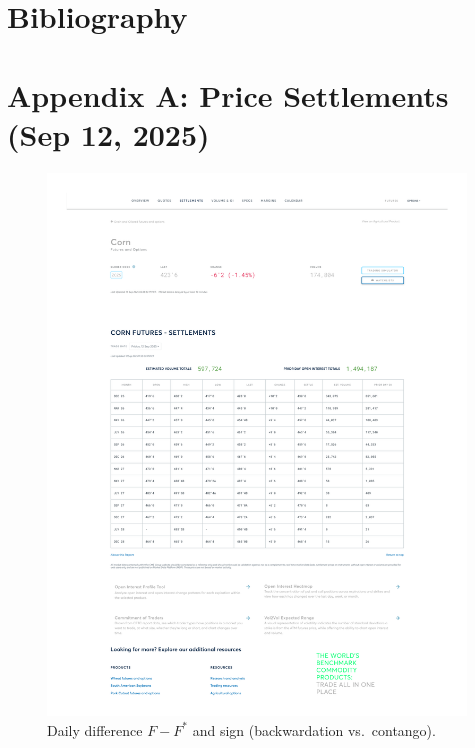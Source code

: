 \documentclass[10pt,a4paper]{article} %
\let\oldsection\section
\renewcommand{\section}{%
    \clearpage
    \thispagestyle{myfancy}%
    \oldsection
  }
\begin{document}
\section{Bibliography}



\section{Appendix A: Price Settlements (Sep 12, 2025)}
\newpage

\begin{figure}[h]
  \centering
  \includegraphics[width=0.99\textwidth]{appendix/CORN12SEP.pdf}
  \caption{Daily difference \(F-F^{*}\) and sign (backwardation vs.\ contango).}
  \label{fig:corn_settlements}
\end{figure}
\end{document}
